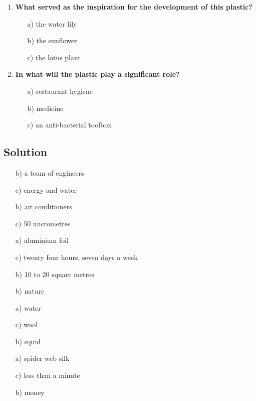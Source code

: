 \begin{enumerate}
      \item \textbf{What served as the inspiration for the development of this plastic?}
            \begin{enumerate}
                  \item[a)] the water lily
                  \item[b)] the sunflower
                  \item[c)] the lotus plant
            \end{enumerate}
      \item \textbf{In what will the plastic play a significant role?}
            \begin{enumerate}
                  \item[a)] restaurant hygiene
                  \item[b)] medicine
                  \item[c)] an anti-bacterial toolbox
            \end{enumerate}
\end{enumerate}

\subsection*{Solution}

\begin{enumerate}
      \item[b)] a team of engineers
      \item[c)] energy and water
      \item[b)] air conditioners
      \item[c)] 50 micrometres
      \item[a)] aluminium foil
      \item[c)] twenty four hours, seven days a week
      \item[b)] 10 to 20 square metres
\end{enumerate}

\begin{enumerate}
      \item[b)] nature
      \item[a)] water
      \item[c)] wool
      \item[b)] squid
      \item[a)] spider web silk
      \item[c)] less than a minute
      \item[b)] money
\end{enumerate}

